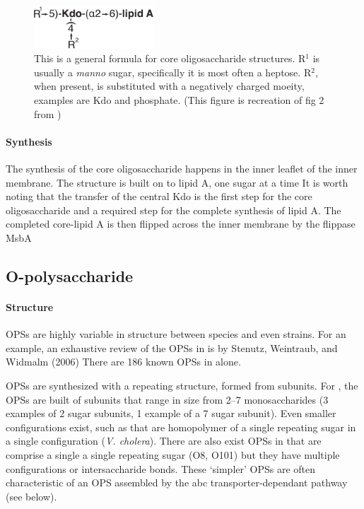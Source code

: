 \begin{figure}[htb]
  	\begin{center}
   		\includegraphics[width=0.4\textwidth]{intro/img/coreformula.pdf}
   	\end{center}
   	\caption[A generalized formula for core oligosaccharides]{This is a general formula for core oligosaccharide structures. R$^1$ is usually a \textit{manno} sugar, specifically it is most often a heptose. R$^2$, when present, is substituted with a negatively charged moeity, examples are Kdo and phosphate. (This figure is recreation of fig 2 from )
}
\label{fig:coreformula}
\end{figure}   

    \paragraph{Synthesis}
 The synthesis of the core oligosaccharide happens in the inner leaflet of the inner membrane. The structure is built on to lipid A, one sugar at a time It is worth noting that the transfer of the central Kdo is the first step for the core oligosaccharide and a required step for the complete synthesis of lipid A. The completed core-lipid A is then flipped across the inner membrane by the flippase MsbA

  \subsection{O-polysaccharide}\label{sec:o-polysaccharide}

    \paragraph{Structure}
    \Acp{OPS} are highly variable in structure between species and even strains. For an example, an exhaustive review of the \acp{OPS} in \ecoli is by Stenutz, Weintraub, and Widmalm (2006) There are 186 known \acp{OPS} in \ecoli alone. 

\Acp{OPS} are synthesized with a repeating structure, formed from subunits. For \ecoli, the \acp{OPS} are built of subunits that range in size from 2--7 monosaccharides (3 examples of 2 sugar subunits, 1 example of a 7 sugar subunit).  Even smaller configurations exist, such as that are homopolymer of a single repeating sugar in a single configuration (\eg \textit{V. cholera}). There are also exist \acp{OPS} in \ecoli that are comprise a single a single repeating sugar (O8, O101) but they have multiple configurations or intersaccharide bonds. These `simpler' \acp{OPS} are often characteristic of an \ac{OPS} assembled by the \ac{abc} transporter-dependant pathway (see below). 
 
